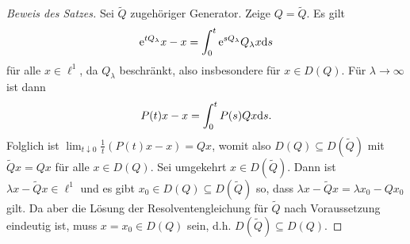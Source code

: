 \documentclass[a4paper]{paper}
\numberwithin{equation}{satz}
\begin{document}
\begin{proof}[Beweis des Satzes]
Sei $\tilde Q$ zugehöriger Generator. Zeige $Q=\tilde Q$. Es gilt $$\text e^{t Q_\lambda}x-x=\int_0^t \text e^{s Q_\lambda}Q_\lambda x\text ds$$ für alle $x\in\ell^1$, da $Q_\lambda$ beschränkt, also insbesondere für $x\in D(Q)$. Für $\lambda\to\infty$ ist dann $$P(t)x-x=\int_0^t P(s)Qx\text ds.$$ Folglich ist $\lim_{t\downarrow 0}\frac{1}{t}(P(t)x-x)=Qx$, womit also $D( Q)\subseteq D(\tilde Q)$ mit $\tilde Qx=Qx$ für alle $x\in D(Q)$. Sei umgekehrt $x\in D(\tilde Q)$. Dann ist $\lambda x- \tilde Qx\in \ell^1$ und es gibt $x_0\in D(Q)\subseteq D(\tilde Q)$ so, dass $\lambda x- \tilde Qx=\lambda x_0-Qx_0$ gilt. Da aber die Lösung der Resolventengleichung für $\tilde Q$ nach Voraussetzung eindeutig ist, muss $x=x_0\in D(Q)$ sein, d.h. $D(\tilde Q)\subseteq D(Q)$.  
\end{proof}
\end{document}
